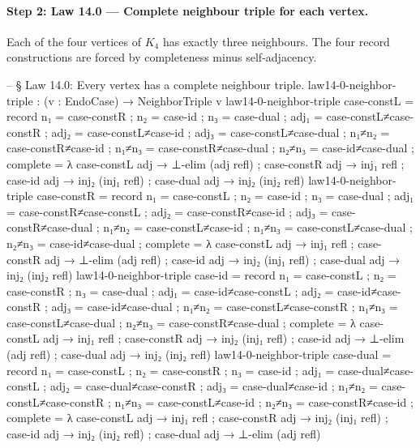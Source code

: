 \documentclass[11pt,a4paper]{book}
\begin{document}
\paragraph{Step 2: Law 14.0 --- Complete neighbour triple for each vertex.}
Each of the four vertices of $K_4$ has exactly three neighbours. The four record constructions
are forced by completeness minus self-adjacency.

\begin{code}
-- § Law 14.0: Every vertex has a complete neighbour triple.
law14-0-neighbor-triple : (v : EndoCase) → NeighborTriple v
law14-0-neighbor-triple case-constL = record
  { n₁ = case-constR
  ; n₂ = case-id
  ; n₃ = case-dual
  ; adj₁ = case-constL≠case-constR
  ; adj₂ = case-constL≠case-id
  ; adj₃ = case-constL≠case-dual
  ; n₁≠n₂ = case-constR≠case-id
  ; n₁≠n₃ = case-constR≠case-dual
  ; n₂≠n₃ = case-id≠case-dual
  ; complete = λ
      { case-constL adj → ⊥-elim (adj refl)
      ; case-constR adj → inj₁ refl
      ; case-id     adj → inj₂ (inj₁ refl)
      ; case-dual   adj → inj₂ (inj₂ refl)
      }
  }
law14-0-neighbor-triple case-constR = record
  { n₁ = case-constL
  ; n₂ = case-id
  ; n₃ = case-dual
  ; adj₁ = case-constR≠case-constL
  ; adj₂ = case-constR≠case-id
  ; adj₃ = case-constR≠case-dual
  ; n₁≠n₂ = case-constL≠case-id
  ; n₁≠n₃ = case-constL≠case-dual
  ; n₂≠n₃ = case-id≠case-dual
  ; complete = λ
      { case-constL adj → inj₁ refl
      ; case-constR adj → ⊥-elim (adj refl)
      ; case-id     adj → inj₂ (inj₁ refl)
      ; case-dual   adj → inj₂ (inj₂ refl)
      }
  }
law14-0-neighbor-triple case-id = record
  { n₁ = case-constL
  ; n₂ = case-constR
  ; n₃ = case-dual
  ; adj₁ = case-id≠case-constL
  ; adj₂ = case-id≠case-constR
  ; adj₃ = case-id≠case-dual
  ; n₁≠n₂ = case-constL≠case-constR
  ; n₁≠n₃ = case-constL≠case-dual
  ; n₂≠n₃ = case-constR≠case-dual
  ; complete = λ
      { case-constL adj → inj₁ refl
      ; case-constR adj → inj₂ (inj₁ refl)
      ; case-id     adj → ⊥-elim (adj refl)
      ; case-dual   adj → inj₂ (inj₂ refl)
      }
  }
law14-0-neighbor-triple case-dual = record
  { n₁ = case-constL
  ; n₂ = case-constR
  ; n₃ = case-id
  ; adj₁ = case-dual≠case-constL
  ; adj₂ = case-dual≠case-constR
  ; adj₃ = case-dual≠case-id
  ; n₁≠n₂ = case-constL≠case-constR
  ; n₁≠n₃ = case-constL≠case-id
  ; n₂≠n₃ = case-constR≠case-id
  ; complete = λ
      { case-constL adj → inj₁ refl
      ; case-constR adj → inj₂ (inj₁ refl)
      ; case-id     adj → inj₂ (inj₂ refl)
      ; case-dual   adj → ⊥-elim (adj refl)
      }
  }


\end{code}
\end{document}
